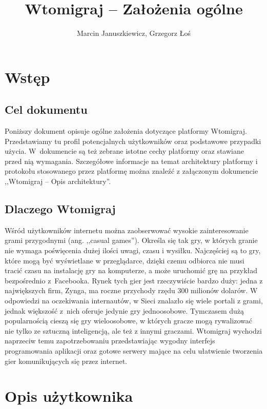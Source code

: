 \documentclass[a4paper, 12pt]{article}
\author{Marcin Januszkiewicz, Grzegorz Łoś}
\title{\textbf{Wtomigraj} -- Założenia ogólne}
\begin{document}

\break

\setcounter{page}{2}

\tableofcontents

\break

\section{Wstęp}

\subsection{Cel dokumentu}
Poniższy dokument opisuje ogólne założenia dotyczące platformy Wtomigraj. Przedstawiamy tu profil potencjalnych użytkowników oraz podstawowe przypadki użycia. W~dokumencie są też zebrane istotne cechy platformy oraz stawiane przed nią wymagania. Szczegółowe informacje na temat architektury platformy i protokołu stosowanego przez platformę można znaleźć z załączonym dokumencie ,,Wtomigraj -- Opis architektury''.

\subsection{Dlaczego Wtomigraj}
Wśród użytkowników internetu można zaobserwować wysokie zainteresowanie grami przygodnymi (ang. ,,casual games''). Określa się tak gry, w których granie nie wymaga poświęcenia dużej ilości uwagi, czasu i wysiłku. Najczęściej są to gry, które mogą być wyświetlane w przeglądarce, dzięki czemu odbiorca nie musi tracić czasu na instalację gry na komputerze, a może uruchomić grę na przykład bezpośrednio z~Facebooka. Rynek tych gier jest rzeczywiście bardzo duży: jedna z największych firm, Zynga, ma roczne przychody rzędu 300 milionów dolarów. W odpowiedzi na oczekiwania internautów, w Sieci znalazło się wiele portali z grami, jednak większość z~nich oferuje jedynie gry jednoosobowe. Tymczasem dużą popularnością cieszą się gry wieloosobowe, w których gracze mogą rywalizować nie tylko ze sztuczną inteligencją, ale też z innymi graczami. Wtomigraj wychodzi naprzeciw temu zapotrzebowaniu przedstawiając wygodny interfejs programowania aplikacji oraz gotowe serwery mające na celu ułatwienie tworzenia gier komunikujących się przez internet.

\section[Opis użytkownika]{Opis użytkownika}
\end{document}
